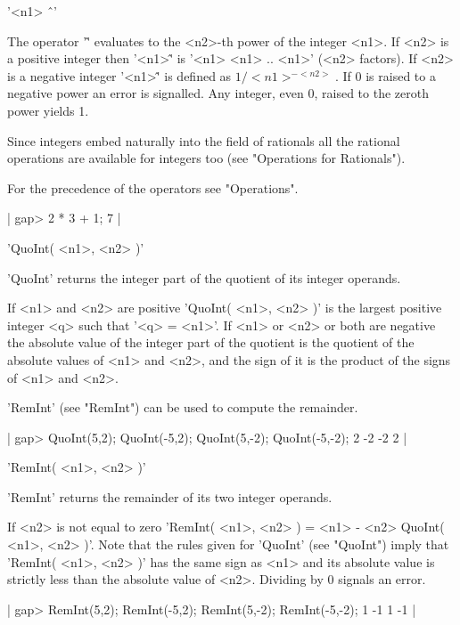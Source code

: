 '<n1> \^\ <n2>'

The operator '\^' evaluates to the <n2>-th power of the integer <n1>.  If
<n2> is a positive integer then '<n1>\^<n2>' is '<n1>\* <n1>\* ..\* <n1>'
(<n2> factors).  If <n2> is a negative integer '<n1>\^<n2>' is defined as
$1 / {<n1>^{-<n2>}}$.  If 0  is raised to  a negative power an  error  is
signalled.  Any integer, even 0, raised to the zeroth power yields 1.

Since  integers  embed naturally into  the  field of  rationals  all  the
rational  operations are available  for integers too (see "Operations for
Rationals").

For the precedence of the operators see "Operations".

|    gap> 2 * 3 + 1;
    7 |

%

'QuoInt( <n1>, <n2> )'

'QuoInt'  returns  the   integer part of   the  quotient  of  its integer
operands.

If <n1>  and  <n2> are positive 'QuoInt(  <n1>,  <n2> )'  is the  largest
positive integer <q> such that '<q> \<= <n1>'.  If <n1>  or <n2> or
both are negative the absolute value of  the integer part of the quotient
is the quotient of the absolute values of <n1> and <n2>,  and the sign of
it is the product of the signs of <n1> and <n2>.

'RemInt' (see "RemInt") can be used to compute the remainder.

|    gap> QuoInt(5,2);  QuoInt(-5,2);  QuoInt(5,-2);  QuoInt(-5,-2);
    2
    -2
    -2
    2 |

%

'RemInt( <n1>, <n2> )'

'RemInt' returns the remainder of its two integer operands.

If  <n2> is not equal to  zero 'RemInt(  <n1>,   <n2> ) =   <n1> - <n2>\*
QuoInt( <n1>,   <n2> )'.  Note   that  the rules  given for 'QuoInt' (see
"QuoInt") imply that 'RemInt( <n1>, <n2> )' has the same sign as <n1> and
its absolute  value is strictly  less  than the  absolute value  of <n2>.
Dividing by 0 signals an error.

|    gap> RemInt(5,2);  RemInt(-5,2);  RemInt(5,-2);  RemInt(-5,-2);
    1
    -1
    1
    -1 |


